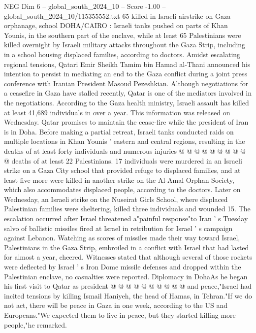 \begin{textsample}{NEG Dim 6 – global\_south\_2024\_10 – Score -1.00 – global\_south\_2024\_10/115355552.txt}  \label{ex:f6_neg_057}
65 killed in Israeli airstrike on Gaza orphanage, school DOHA/CAIRO : Israeli tanks pushed on parts of Khan Younis, in the southern part of the enclave, while at least 65 Palestinians were killed overnight by Israeli military attacks throughout the Gaza Strip, including in a school housing displaced families, according to doctors.
Amidst escalating regional tensions, Qatari Emir Sheikh Tamim bin Hamad al-Thani announced his intention to persist in mediating an end to the Gaza conflict during a joint press conference with Iranian President Masoud Pezeshkian.
Although negotiations for a ceasefire in Gaza have stalled recently, Qatar is one of the mediators involved in the negotiations.
According to the Gaza health ministry, Israeli assault has killed at least 41,689 individuals in over a year.
This information was released on Wednesday.
Qatar promises to maintain the cease-fire while the president of Iran is in Doha.
Before making a partial retreat, Israeli tanks conducted raids on multiple locations in Khan Younis ' eastern and central regions, resulting in the deaths of at least forty individuals and numerous injuries @ @ @ @ @ @ @ @ @ @ deaths of at least 22 Palestinians. 17 individuals were murdered in an Israeli strike on a Gaza City school that provided refuge to displaced families, and at least five more were killed in another strike on the Al-Amal Orphan Society, which also accommodates displaced people, according to the doctors.
Later on Wednesday, an Israeli strike on the Nuseirat Girls School, where displaced Palestinian families were sheltering, killed three individuals and wounded 15.
The escalation occurred after Israel threatened a"painful response"to Iran ' s Tuesday salvo of ballistic missiles fired at Israel in retribution for Israel ' s campaign against Lebanon.
Watching as scores of missiles made their way toward Israel, Palestinians in the Gaza Strip, embroiled in a conflict with Israel that had lasted for almost a year, cheered.
Witnesses stated that although several of those rockets were deflected by Israel ' s Iron Dome missile defenses and dropped within the Palestinian enclave, no casualties were reported.
Diplomacy in DohaAs he began his first visit to Qatar as president @ @ @ @ @ @ @ @ @ @ and peace,"Israel had incited tensions by killing Ismail Haniyeh, the head of Hamas, in Tehran."If we do not act, there will be peace in Gaza in one week, according to the US and Europeans."We expected them to live in peace, but they started killing more people,"he remarked.

\end{textsample}
